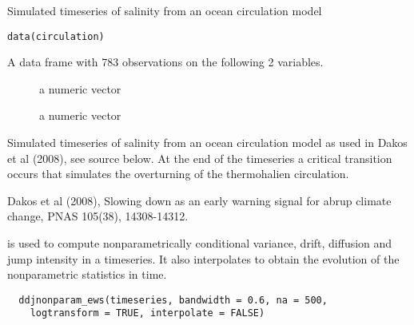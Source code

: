 \documentclass[a4paper]{book}
\begin{document}
%
\begin{Description}\relax
Simulated timeseries of salinity from an ocean circulation model

\end{Description}
%
\begin{Usage}
\begin{verbatim}
data(circulation)
\end{verbatim}
\end{Usage}
%
\begin{Format}
A data frame with 783 observations on the following 2 variables.
\begin{description}

\item[] a numeric vector
\item[] a numeric vector

\end{description}

\end{Format}
%
\begin{Details}\relax
Simulated timeseries of salinity from an ocean circulation model as used in Dakos et al (2008), see source below. At the end of the timeseries a critical transition occurs that simulates the overturning of the thermohalien circulation.

\end{Details}
%
\begin{Source}\relax
Dakos et al (2008), Slowing down as an early warning signal for abrup climate change, PNAS 105(38), 14308-14312.

\end{Source}
%
\begin{Description}\relax
{} is used to compute
nonparametrically conditional variance, drift, diffusion
and jump intensity in a timeseries. It also interpolates
to obtain the evolution of the nonparametric statistics
in time.
\end{Description}
%
\begin{Usage}
\begin{verbatim}
  ddjnonparam_ews(timeseries, bandwidth = 0.6, na = 500,
    logtransform = TRUE, interpolate = FALSE)
\end{verbatim}
\end{Usage}
\end{document}
